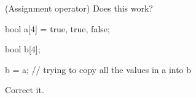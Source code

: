 (Assignment operator) Does this work?

\begin{consolethree}[escapeinside=||]

bool a[4] = {true, true, false};

bool b[4];

b = a; // trying to copy all the values in a into b 

\end{consolethree}

Correct it.

